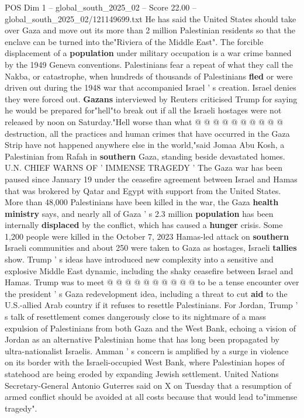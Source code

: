 \begin{textsample}{POS Dim 1 – global\_south\_2025\_02 – Score 22.00 – global\_south\_2025\_02/121149699.txt}
He has said the United States should take over Gaza and move out its more than 2 million Palestinian residents so that the enclave can be turned into the"Riviera of the Middle East".
The forcible displacement of a \textbf{population} under military occupation is a war crime banned by the 1949 Geneva conventions.
Palestinians fear a repeat of what they call the Nakba, or catastrophe, when hundreds of thousands of Palestinians \textbf{fled} or were driven out during the 1948 war that accompanied Israel ' s creation.
Israel denies they were forced out. \textbf{Gazans} interviewed by Reuters criticised Trump for saying he would be prepared for"hell"to break out if all the Israeli hostages were not released by noon on Saturday."Hell worse than what @ @ @ @ @ @ @ @ @ @ destruction, all the practices and human crimes that have occurred in the Gaza Strip have not happened anywhere else in the world,"said Jomaa Abu Kosh, a Palestinian from Rafah in \textbf{southern} Gaza, standing beside devastated homes.
U.N.
CHIEF WARNS OF ' IMMENSE TRAGEDY ' The Gaza war has been paused since January 19 under the ceasefire agreement between Israel and Hamas that was brokered by Qatar and Egypt with support from the United States.
More than 48,000 Palestinians have been killed in the war, the Gaza \textbf{health} \textbf{ministry} says, and nearly all of Gaza ' s 2.3 million \textbf{population} has been internally \textbf{displaced} by the conflict, which has caused a \textbf{hunger} crisis.
Some 1,200 people were killed in the October 7, 2023 Hamas-led attack on \textbf{southern} Israeli communities and about 250 were taken to Gaza as hostages, Israeli \textbf{tallies} show.
Trump ' s ideas have introduced new complexity into a sensitive and explosive Middle East dynamic, including the shaky ceasefire between Israel and Hamas.
Trump was to meet @ @ @ @ @ @ @ @ @ @ to be a tense encounter over the president ' s Gaza redevelopment idea, including a threat to cut \textbf{aid} to the U.S.-allied Arab country if it refuses to resettle Palestinians.
For Jordan, Trump ' s talk of resettlement comes dangerously close to its nightmare of a mass expulsion of Palestinians from both Gaza and the West Bank, echoing a vision of Jordan as an alternative Palestinian home that has long been propagated by ultra-nationalist Israelis.
Amman ' s concern is amplified by a surge in violence on its border with the Israeli-occupied West Bank, where Palestinian hopes of statehood are being eroded by expanding Jewish settlement.
United Nations Secretary-General Antonio Guterres said on X on Tuesday that a resumption of armed conflict should be avoided at all costs because that would lead to"immense tragedy".

\end{textsample}
